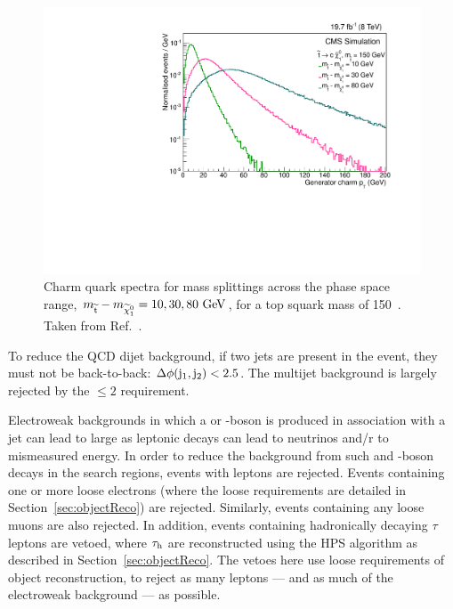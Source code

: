 \begin{figure}%
  \begin{center}
  \includegraphics[scale=0.45]{Figures/sus13009/charmpt.pdf}
  \caption{Charm quark \pt{} spectra for mass splittings across the phase space range, $m_{\widetilde{{\rm t}}}-m_{\widetilde{\chi}^{0}_{1}}=10, 30, 80~\mathrm{GeV}$, for a top squark mass of 150~\GeV. Taken from Ref.~\cite{sus14001}.
         \label{stopj2pT}}
  \end{center}
\end{figure}

To reduce the \ac{QCD} dijet background, if two jets are present in the event, they must not be back-to-back: 
$\Delta \phi ({\rm j}_1,{\rm j}_2) < 2.5$. 
The multijet background is largely rejected by the \njets$\le2$ requirement.

Electroweak backgrounds in which a \W{} or \Z{}-boson is produced in association with a jet can lead to large \MET as leptonic decays can lead to neutrinos and/r to mismeasured energy.
In order to reduce the background from such \Z{} and \W-boson decays in the search regions, events
with leptons are rejected. 
Events containing one or more loose electrons  (where the loose requirements are detailed in Section~\ref{sec:objectReco}) are rejected. 
Similarly, events containing any loose muons  are also rejected. 
In addition, events containing hadronically decaying $\tau$ leptons are vetoed, where $\tau_\mathrm{h}$ are reconstructed using the \ac{HPS} algorithm as described in Section~\ref{sec:objectReco}.
The vetoes here use loose requirements of object reconstruction, to reject as many leptons --- and as much of the electroweak background --- as possible.

